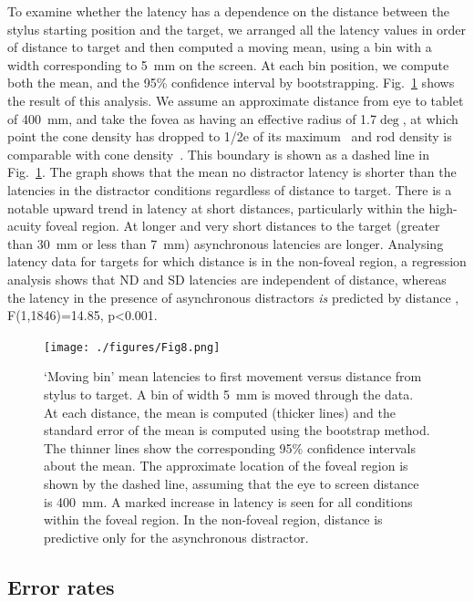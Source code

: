 \documentclass[10pt,letterpaper]{article}
\begin{document}
To examine whether the latency has a dependence on the distance
between the stylus starting position and the target, we arranged all
the latency values in order of distance to target and then computed a
moving mean, using a bin with a width corresponding to 5~mm on the
screen. At each bin position, we compute both the mean, and the 95\%
confidence interval by bootstrapping. Fig.~\ref{latvsdist} shows the
result of this analysis. We assume an approximate distance from eye to
tablet of 400~mm, and take the fovea as having an effective radius of
1.7$\deg$, at which point the cone density has dropped to 1/2e of its
maximum~\cite{hirsch_spatial_1989} and rod density is comparable with
cone density~\cite{jonas_count_1992}. This boundary is shown as a
dashed line in Fig.~\ref{latvsdist}. The graph shows that the mean no
distractor latency is shorter than the latencies in the distractor
conditions regardless of distance to target. There is a notable upward
trend in latency at short distances, particularly within the
high-acuity foveal region. At longer and very short distances to the
target (greater than 30~mm or less than 7~mm) asynchronous latencies
are longer. Analysing latency data for targets for which distance is
in the non-foveal region, a regression analysis shows that ND and SD
latencies are independent of distance, whereas the latency in the
presence of asynchronous distractors \emph{is} predicted by distance
, F(1,1846)=14.85, p\textless0.001.

\begin{figure}[htb!]
\centering
\texttt{[image: ./figures/Fig8.png]} %
\caption[Mean latencies vs. distance] {`Moving bin' mean latencies to
  first movement versus distance from stylus to target. A bin of width
  5~mm is moved through the data. At each distance, the mean is
  computed (thicker lines) and the standard error of the mean is
  computed using the bootstrap method. The thinner lines show the
  corresponding 95\% confidence intervals about the mean. The
  approximate location of the foveal region is shown by the dashed
  line, assuming that the eye to screen distance is 400~mm. A marked
  increase in latency is seen for all conditions within the foveal
  region. In the non-foveal region, distance is predictive only for
  the asynchronous distractor.}
\label{latvsdist}
\end{figure}


\subsection*{Error rates}
\end{document}
